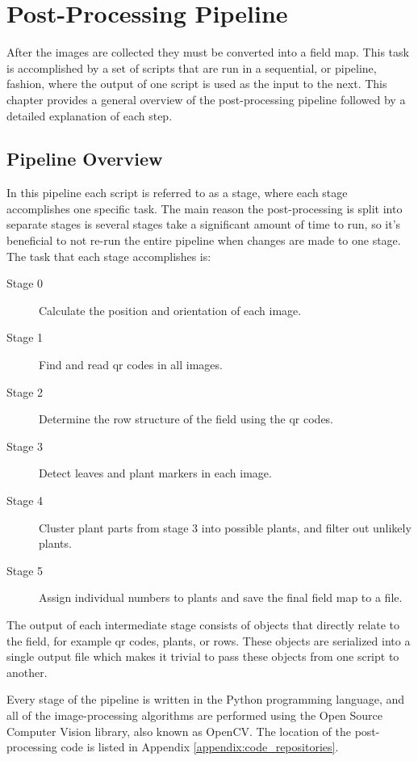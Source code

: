 
\cleardoublepage

\chapter{Post-Processing Pipeline}
\label{chapter:pipeline}

After the images are collected they must be converted into a field map. This task is accomplished by a set of scripts that are run in a sequential, or pipeline, fashion, where the output of one script is used as the input to the next.  This chapter provides a general overview of the post-processing pipeline followed by a detailed explanation of each step.

\section{Pipeline Overview}
\label{processing-overview}

In this pipeline each script is referred to as a stage, where each stage accomplishes one specific task.  The main reason the post-processing is split into separate stages is several stages take a significant amount of time to run, so it's beneficial to not re-run the entire pipeline when changes are made to one stage.  The task that each stage accomplishes is:

\begin{description}
\item[Stage 0] Calculate the position and orientation of each image.
\item[Stage 1] Find and read \ac{qr} codes in all images.
\item[Stage 2] Determine the row structure of the field using the \ac{qr} codes.
\item[Stage 3] Detect leaves and plant markers in each image.
\item[Stage 4] Cluster plant parts from stage 3 into possible plants, and filter out unlikely plants.
\item[Stage 5] Assign individual numbers to plants and save the final field map to a file. 
\end{description}
 
The output of each intermediate stage consists of objects that directly relate to the field, for example \ac{qr} codes, plants, or rows.  These objects are serialized into a single output file which makes it trivial to pass these objects from one script to another. 

Every stage of the pipeline is written in the Python programming language, and all of the image-processing algorithms are performed using the Open Source Computer Vision library, also known as OpenCV.  The location of the post-processing code is listed in Appendix \ref{appendix:code_repositories}.

